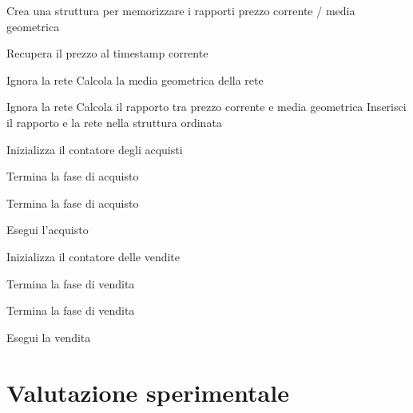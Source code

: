 \documentclass[a4paper,oneside,italian]{sapthesis}
\begin{document}
\begin{algorithm}[H]
\caption{Strategia SmartGeometric}
\label{alg:smart-geometric-strategy}
\begin{algorithmic}[1]

\State Crea una struttura per memorizzare i rapporti
\State prezzo corrente / media geometrica

    \State Recupera il prezzo al timestamp corrente

        \State Ignora la rete
    \Else
        \State Calcola la media geometrica della rete

            \State Ignora la rete
        \Else
            \State Calcola il rapporto tra prezzo corrente e media geometrica
            \State Inserisci il rapporto e la rete nella struttura ordinata
        \EndIf
    \EndIf
\EndFor

\State Inizializza il contatore degli acquisti

        \State Termina la fase di acquisto
    \EndIf

        \State Termina la fase di acquisto
    \EndIf

        \State Esegui l'acquisto
    \EndIf
\EndFor

\State Inizializza il contatore delle vendite

        \State Termina la fase di vendita
    \EndIf

        \State Termina la fase di vendita
    \EndIf

        \State Esegui la vendita
    \EndIf
\EndFor

\end{algorithmic}
\end{algorithm}


\chapter{Valutazione sperimentale}
\label{chap:results}
\end{document}
